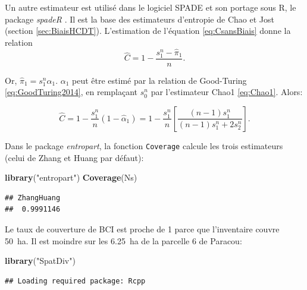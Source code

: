 \documentclass[
  11pt,
  french,
  a4paper,
  extrafontsizes,onecolumn,openright
  ]{memoir}
\newenvironment{Shaded}{\begin{snugshade}}{\end{snugshade}}
\newcommand{\KeywordTok}[1]{\textcolor[rgb]{0.13,0.29,0.53}{\textbf{#1}}}
\newcommand{\NormalTok}[1]{#1}
\newcommand{\StringTok}[1]{\textcolor[rgb]{0.31,0.60,0.02}{#1}}
\begin{document}
Un autre estimateur est utilisé dans le logiciel SPADE \autocite{Chao2010a} et son portage sous R, le package \emph{spadeR} \autocite{Chao2016c}.
Il est la base des estimateurs d'entropie de Chao et Jost (section \ref{sec:BiaisHCDT}).
L'estimation de l'équation \eqref{eq:CsansBiais} donne la relation
\begin{equation}
  \label{eq:hatC2}
  \hat{C} = 1-\frac{s^{n}_{1} - \hat{\pi}_1}{n}.
\end{equation}

Or, \(\hat{\pi}_1 = s^{n}_{1} \hat{\alpha}_1\).
\(\alpha_1\) peut être estimé par la relation de Good-Turing \eqref{eq:GoodTuring2014}, en remplaçant \(s^{n}_{0}\) par l'estimateur Chao1 \eqref{eq:Chao1}.
Alors:

\begin{equation} 
  \label{eq:CChao}
  \hat{C} = 1-\frac{s^{n}_{1}}{n}(1 - \hat{\alpha}_1)
  = 1-\frac{s^{n}_{1}}{n}\left[\frac{\left(n-1\right)s^{n}_{1}}{\left(n-1\right)s^{n}_{1}+2s^{n}_{2}}\right].
\end{equation}

Dans le package \emph{entropart}, la fonction \texttt{Coverage} calcule les trois estimateurs (celui de Zhang et Huang par défaut):

\scriptsize

\begin{Shaded}
\begin{Highlighting}[]
\KeywordTok{library}\NormalTok{(}\StringTok{"entropart"}\NormalTok{)}
\KeywordTok{Coverage}\NormalTok{(Ns)}
\end{Highlighting}
\end{Shaded}

\begin{verbatim}
## ZhangHuang 
##  0.9991146
\end{verbatim}

\normalsize

Le taux de couverture de BCI est proche de 1 parce que l'inventaire couvre 50~ha.
Il est moindre sur les 6.25~ha de la parcelle 6 de Paracou:

\scriptsize

\begin{Shaded}
\begin{Highlighting}[]
\KeywordTok{library}\NormalTok{(}\StringTok{"SpatDiv"}\NormalTok{)}
\end{Highlighting}
\end{Shaded}

\begin{verbatim}
## Loading required package: Rcpp
\end{verbatim}
\end{document}
